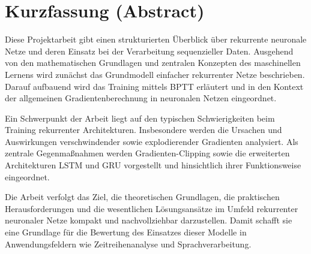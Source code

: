 \chapter*{Kurzfassung (Abstract)}

Diese Projektarbeit gibt einen strukturierten Überblick über rekurrente neuronale Netze und deren Einsatz bei der Verarbeitung sequenzieller Daten. Ausgehend von den mathematischen Grundlagen und zentralen Konzepten des maschinellen Lernens wird zunächst das Grundmodell einfacher rekurrenter Netze beschrieben. Darauf aufbauend wird das Training mittels \ac{BPTT} erläutert und in den Kontext der allgemeinen Gradientenberechnung in neuronalen Netzen eingeordnet.

Ein Schwerpunkt der Arbeit liegt auf den typischen Schwierigkeiten beim Training rekurrenter Architekturen. Insbesondere werden die Ursachen und Auswirkungen verschwindender sowie explodierender Gradienten analysiert. Als zentrale Gegenmaßnahmen werden Gradienten-Clipping sowie die erweiterten Architekturen \ac{LSTM} und \ac{GRU} vorgestellt und hinsichtlich ihrer Funktionsweise eingeordnet.

Die Arbeit verfolgt das Ziel, die theoretischen Grundlagen, die praktischen Herausforderungen und die wesentlichen Lösungsansätze im Umfeld rekurrenter neuronaler Netze kompakt und nachvollziehbar darzustellen. Damit schafft sie eine Grundlage für die Bewertung des Einsatzes dieser Modelle in Anwendungsfeldern wie Zeitreihenanalyse und Sprachverarbeitung.

